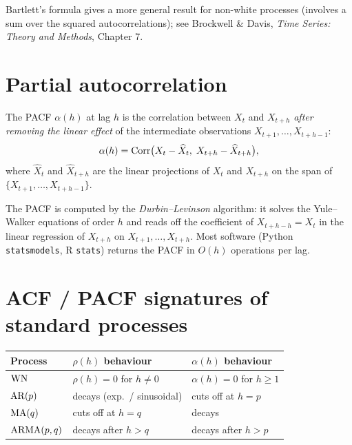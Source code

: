 \begin{rembox}
Bartlett's formula gives a more general result for non-white processes
(involves a sum over the squared autocorrelations); see Brockwell \&
Davis, \emph{Time Series: Theory and Methods}, Chapter 7.
\end{rembox}

\section{Partial autocorrelation}
\label{sec:pacf}

\begin{defbox}
\label{def:pacf}
The PACF $\alpha(h)$ at lag $h$ is the correlation between $X_t$ and
$X_{t+h}$ \emph{after removing the linear effect} of the intermediate
observations $X_{t+1}, \dots, X_{t+h-1}$:
\[
  \alpha(h) = \mathrm{Corr}\bigl(X_t - \widehat X_t,\; X_{t+h} - \widehat X_{t+h}\bigr),
\]
where $\widehat X_t$ and $\widehat X_{t+h}$ are the linear projections
of $X_t$ and $X_{t+h}$ on the span of $\{X_{t+1}, \dots, X_{t+h-1}\}$.
\end{defbox}

\begin{rembox}
The PACF is computed by the \emph{Durbin--Levinson} algorithm: it
solves the Yule--Walker equations of order $h$ and reads off the
coefficient of $X_{t+h-h} = X_t$ in the linear regression of $X_{t+h}$
on $X_{t+1}, \dots, X_{t+h}$. Most software (Python
\texttt{statsmodels}, R \texttt{stats}) returns the PACF in $O(h)$
operations per lag.
\end{rembox}

\section{ACF / PACF signatures of standard processes}
\label{sec:acf-signatures}

\begin{center}
\begin{tabular}{lll}
\toprule
\textbf{Process} & \textbf{$\rho(h)$ behaviour} & \textbf{$\alpha(h)$ behaviour} \\
\midrule
$\mathrm{WN}$           & $\rho(h) = 0$ for $h \neq 0$         & $\alpha(h) = 0$ for $h \geq 1$ \\
$\mathrm{AR}(p)$        & decays (exp.\ / sinusoidal)          & cuts off at $h = p$ \\
$\mathrm{MA}(q)$       & cuts off at $h = q$                  & decays \\
$\mathrm{ARMA}(p,q)$   & decays after $h > q$                 & decays after $h > p$ \\
\bottomrule
\end{tabular}
\end{center}

